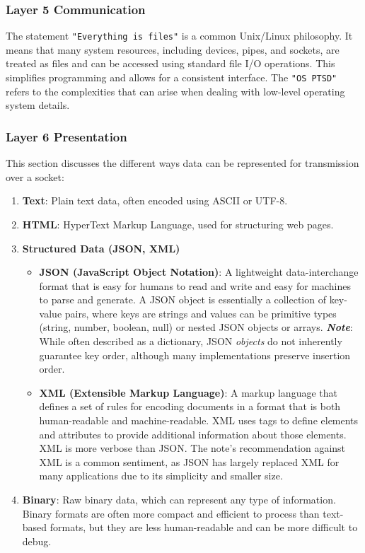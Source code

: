 \subsubsection{Layer 5 Communication}
The statement \texttt{"Everything is files"} is a common Unix/Linux philosophy. It means that many system resources, including devices, pipes, and sockets, are treated as files and can be accessed using standard file I/O operations. This simplifies programming and allows for a consistent interface.  The \texttt{"OS PTSD"} refers to the complexities that can arise when dealing with low-level operating system details.

\subsubsection{Layer 6 Presentation}

This section discusses the different ways data can be represented for transmission over a socket:

\begin{enumerate}[itemsep=1pt]
    \item \textbf{Text}:  Plain text data, often encoded using ASCII or UTF-8.
    \item \textbf{HTML}:  HyperText Markup Language, used for structuring web pages.
    \item \textbf{Structured Data (JSON, XML)}
    \begin{itemize}[itemsep=1pt, topsep=1pt]
		\item \textbf{JSON (JavaScript Object Notation)}: A lightweight data-interchange format that is easy for humans to read and write and easy for machines to parse and generate. A JSON object is essentially a collection of key-value pairs, where keys are strings and values can be primitive types (string, number, boolean, null) or nested JSON objects or arrays. \textit{\textbf{Note}}: While often described as a dictionary, JSON \textit{objects} do not inherently guarantee key order, although many implementations preserve insertion order.
		\item \textbf{XML (Extensible Markup Language)}:  A markup language that defines a set of rules for encoding documents in a format that is both human-readable and machine-readable.  XML uses tags to define elements and attributes to provide additional information about those elements. XML is more verbose than JSON.  The note's recommendation against XML is a common sentiment, as JSON has largely replaced XML for many applications due to its simplicity and smaller size.
		\end{itemize}

	\item \textbf{Binary}: Raw binary data, which can represent any type of information.  Binary formats are often more compact and efficient to process than text-based formats, but they are less human-readable and can be more difficult to debug.
\end{enumerate}



